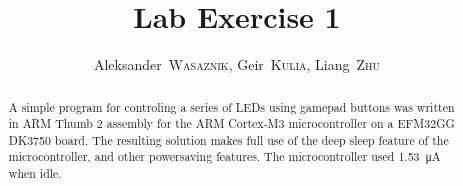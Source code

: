 \documentclass[a4,journal,twoside]{IEEEtran}
\begin{document}
\title{Lab Exercise 1}
\author{Aleksander~\textsc{Wasaznik},
        Geir~\textsc{Kulia},
        Liang~\textsc{Zhu}}


\maketitle

\begin{abstract}
    A simple program for controling a series of LEDs using gamepad buttons was written in ARM Thumb 2 assembly for the ARM Cortex-M3 microcontroller on a EFM32GG DK3750 board.
    The resulting solution makes full use of the deep sleep feature of the microcontroller, and other powersaving features.
    The microcontroller used \SI{1.53}{\micro\ampere} when idle.
\end{abstract}



\end{document}
